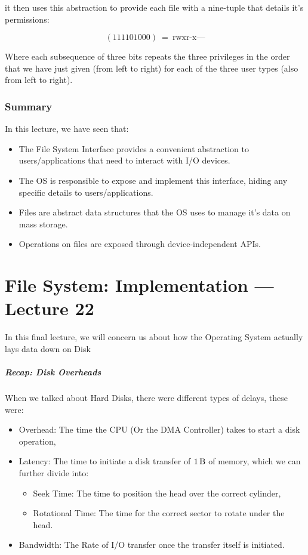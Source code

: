 \documentclass[openright, twoside]{report}
\theoremstyle{definition}
\theoremstyle{example}
\begin{document}
it then uses this abstraction to provide each file with a 
nine-tuple that details it's permissions:

\[
	(111101000)\ =\ \text{rwxr-x---}
\]

Where each subsequence of three bits repeats the three privileges in the 
order that we have just given (from left to right) for each of the three
user types (also from left to right).

\subsection{Summary}
In this lecture, we have seen that:

\begin{itemize}
	\item The File System Interface provides a convenient abstraction to 
	users/applications that need to interact with I/O devices.
	\item The OS is responsible to expose and implement this interface, hiding 
	any specific details to users/applications.
	\item Files are abstract data structures that the OS uses to manage 
	it's data on mass storage.
	\item Operations on files are exposed through device-independent APIs.
\end{itemize}

\chapter{File System: Implementation --- Lecture 22}
In this final lecture, we will concern us about how the Operating System 
actually lays data down on Disk

\paragraph{Recap: Disk Overheads}
When we talked about Hard Disks, there were different types of delays, these 
were:

\begin{itemize}
	\item Overhead: The time the CPU (Or the DMA Controller) takes to start 
	a disk operation,
	\item Latency: The time to initiate a disk transfer of $\SI{1}{\byte}$ of memory,
	which we can further divide into:
	\begin{itemize}
		\item Seek Time: The time to position the head over the correct cylinder,
		\item Rotational Time: The time for the correct sector to rotate under the head.
	\end{itemize}
	\item Bandwidth: The Rate of I/O transfer once the transfer itself is initiated.
\end{itemize}
\end{document}
